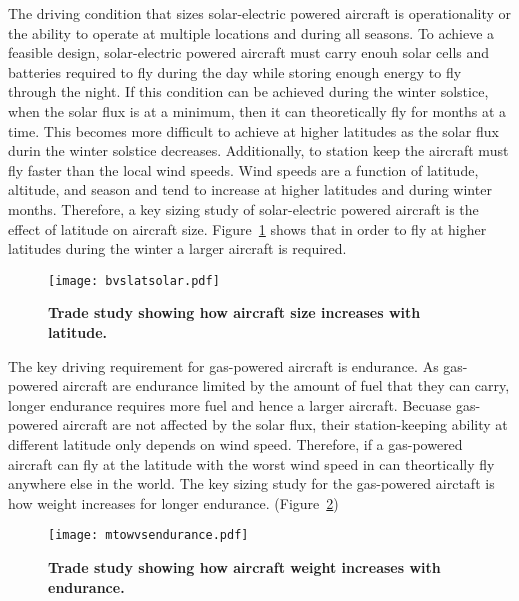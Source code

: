 \documentclass[]{aiaa-tc}%
\begin{document}
The driving condition that sizes solar-electric powered aircraft is operationality or the ability to operate at multiple locations and during all seasons.  
To achieve a feasible design, solar-electric powered aircraft must carry enouh solar cells and batteries required to fly during the day while storing enough energy to fly through the night. 
If this condition can be achieved during the winter solstice, when the solar flux is at a minimum, then it can theoretically fly for months at a time. 
This becomes more difficult to achieve at higher latitudes as the solar flux durin the winter solstice decreases.  
Additionally, to station keep the aircraft must fly faster than the local wind speeds.  
Wind speeds are a function of latitude, altitude, and season and tend to increase at higher latitudes and during winter months. 
Therefore, a key sizing study of solar-electric powered aircraft is the effect of latitude on aircraft size.  
Figure~\ref{f:bvslatsolar} shows that in order to fly at higher latitudes during the winter a larger aircraft is required. 

\begin{figure}[H]
	\begin{center}
	\texttt{[image: bvslatsolar.pdf]}
    \caption{ \textbf{ Trade study showing how aircraft size increases with latitude.  }}
	\label{f:bvslatsolar}
	\end{center}
\end{figure}

The key driving requirement for gas-powered aircraft is endurance.  
As gas-powered aircraft are endurance limited by the amount of fuel that they can carry, longer endurance requires more fuel and hence a larger aircraft.  
Becuase gas-powered aircraft are not affected by the solar flux, their station-keeping ability at different latitude only depends on wind speed. 
Therefore, if a gas-powered aircraft can fly at the latitude with the worst wind speed in can theortically fly anywhere else in the world.  
The key sizing study for the gas-powered airctaft is how weight increases for longer endurance. (Figure~\ref{f:mtowvsendurance}) 

\begin{figure}[H]
	\begin{center}
	\texttt{[image: mtowvsendurance.pdf]}
    \caption{ \textbf{ Trade study showing how aircraft weight increases with endurance.  }}
	\label{f:mtowvsendurance}
	\end{center}
\end{figure}
\end{document}
